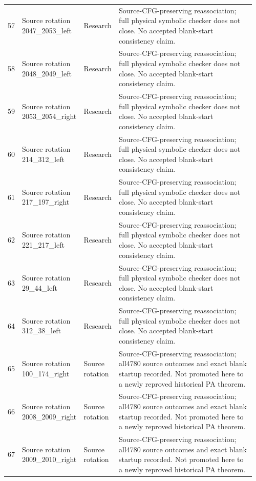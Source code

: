 \begin{longtable}{@{}p{0.035\linewidth}p{0.235\linewidth}p{0.135\linewidth}p{0.55\linewidth}@{}}
57 & Source rotation 2047\_\allowbreak{}2053\_\allowbreak{}left & Research & Source-CFG-preserving reassociation; full physical symbolic checker does not close. No accepted blank-start consistency claim.\\[4pt]
58 & Source rotation 2048\_\allowbreak{}2049\_\allowbreak{}left & Research & Source-CFG-preserving reassociation; full physical symbolic checker does not close. No accepted blank-start consistency claim.\\[4pt]
59 & Source rotation 2053\_\allowbreak{}2054\_\allowbreak{}right & Research & Source-CFG-preserving reassociation; full physical symbolic checker does not close. No accepted blank-start consistency claim.\\[4pt]
60 & Source rotation 214\_\allowbreak{}312\_\allowbreak{}left & Research & Source-CFG-preserving reassociation; full physical symbolic checker does not close. No accepted blank-start consistency claim.\\[4pt]
61 & Source rotation 217\_\allowbreak{}197\_\allowbreak{}right & Research & Source-CFG-preserving reassociation; full physical symbolic checker does not close. No accepted blank-start consistency claim.\\[4pt]
62 & Source rotation 221\_\allowbreak{}217\_\allowbreak{}left & Research & Source-CFG-preserving reassociation; full physical symbolic checker does not close. No accepted blank-start consistency claim.\\[4pt]
63 & Source rotation 29\_\allowbreak{}44\_\allowbreak{}left & Research & Source-CFG-preserving reassociation; full physical symbolic checker does not close. No accepted blank-start consistency claim.\\[4pt]
64 & Source rotation 312\_\allowbreak{}38\_\allowbreak{}left & Research & Source-CFG-preserving reassociation; full physical symbolic checker does not close. No accepted blank-start consistency claim.\\[4pt]
65 & Source rotation 100\_\allowbreak{}174\_\allowbreak{}right & Source rotation & Source-CFG-preserving reassociation; all4780 source outcomes and exact blank startup recorded. Not promoted here to a newly reproved historical PA theorem.\\[4pt]
66 & Source rotation 2008\_\allowbreak{}2009\_\allowbreak{}right & Source rotation & Source-CFG-preserving reassociation; all4780 source outcomes and exact blank startup recorded. Not promoted here to a newly reproved historical PA theorem.\\[4pt]
67 & Source rotation 2009\_\allowbreak{}2010\_\allowbreak{}right & Source rotation & Source-CFG-preserving reassociation; all4780 source outcomes and exact blank startup recorded. Not promoted here to a newly reproved historical PA theorem.\\[4pt]

\end{longtable}
